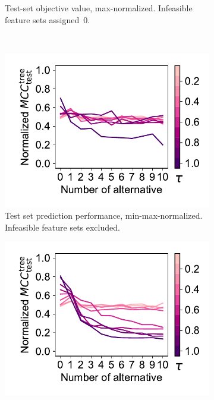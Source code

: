 \documentclass{article}
\theoremstyle{definition}
\begin{document}
\begin{figure}[p]
\begin{subfigure}[t]{0.48\textwidth}
		\caption{
			Test-set objective value, max-norma\-lized.
			Infeasible feature sets assigned~0.
		}
		\label{fig:afs:impact-num-alternatives-tau-test-objective-max-fillna}
	\end{subfigure}
	\\ \vspace{\baselineskip}
	\begin{subfigure}[t]{0.48\textwidth}
		\centering
		\includegraphics[width=\textwidth, trim=15 15 10 15, clip]{plots/impact-num-alternatives-tau-decision-tree-test-mcc-min-max.pdf}
		\caption{
			Test set prediction performance, min-max-normalized.
			Infeasible feature sets excluded.
		}
		\label{fig:afs:impact-num-alternatives-tau-decision-tree-test-mcc-min-max}
	\end{subfigure}
	\hfill
	\begin{subfigure}[t]{0.48\textwidth}
		\centering
		\includegraphics[width=\textwidth, trim=15 15 10 15, clip]{plots/impact-num-alternatives-tau-decision-tree-test-mcc-min-max-fillna.pdf}

\end{subfigure}
\end{figure}
\end{document}
